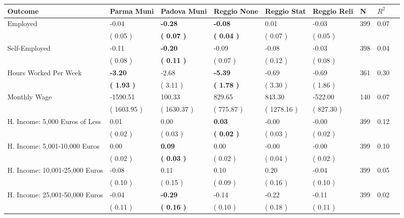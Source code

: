 \begin{tabular}{L{6.2cm} C{1.8cm} C{1.8cm} C{1.8cm} C{1.8cm} C{1.8cm} C{1.8cm} C{0.3cm} C{0.3cm}}
\toprule
 \textbf{Outcome} & \textbf{Parma Muni} & \textbf{Padova Muni} & \textbf{Reggio None} & \textbf{Reggio Stat} & \textbf{Reggio Reli} & \textbf{N} & \textbf{$ R^2$} \\
\midrule
Employed &     -0.04 & \textbf{    -0.28} & \textbf{    -0.08} &      0.01 &     -0.03  & 399 &       0.07 \\ 
 & (     0.05 ) & \textbf{(     0.07 )} & \textbf{(     0.04 )} & (     0.07 ) & (     0.05 )  & \\
Self-Employed &     -0.11 & \textbf{    -0.20} &     -0.09 &     -0.08 &     -0.03  & 398 &       0.04 \\ 
 & (     0.08 ) & \textbf{(     0.11 )} & (     0.07 ) & (     0.12 ) & (     0.08 )  & \\
Hours Worked Per Week & \textbf{    -3.20} &     -2.68 & \textbf{    -5.39} &     -0.69 &     -0.69  & 361 &       0.30 \\ 
 & \textbf{(     1.93 )} & (     3.11 ) & \textbf{(     1.78 )} & (     3.30 ) & (     1.86 )  & \\
Monthly Wage &  -1590.51 &    100.33 &    829.65 &    843.30 &   -522.00  & 140 &       0.07 \\ 
 & (  1603.95 ) & (  1630.37 ) & (   775.87 ) & (  1278.16 ) & (   827.30 )  & \\
H. Income: 5,000 Euros of Less &      0.01 &      0.00 & \textbf{     0.03} &     -0.00 &     -0.00  & 399 &       0.12 \\ 
 & (     0.02 ) & (     0.03 ) & \textbf{(     0.02 )} & (     0.03 ) & (     0.02 )  & \\
H. Income: 5,001-10,000 Euros &      0.00 & \textbf{     0.09} &      0.00 &     -0.00 &     -0.00  & 399 &       0.10 \\ 
 & (     0.02 ) & \textbf{(     0.03 )} & (     0.02 ) & (     0.04 ) & (     0.02 )  & \\
H. Income: 10,001-25,000 Euros &     -0.08 &      0.11 &      0.10 &      0.20 &     -0.04  & 399 &       0.05 \\ 
 & (     0.10 ) & (     0.15 ) & (     0.09 ) & (     0.16 ) & (     0.10 )  & \\
H. Income: 25,001-50,000 Euros &     -0.04 & \textbf{    -0.29} &     -0.14 &     -0.22 &     -0.11  & 399 &       0.02 \\ 
 & (     0.11 ) & \textbf{(     0.16 )} & (     0.10 ) & (     0.18 ) & (     0.11 )  & \\

\end{tabular}
